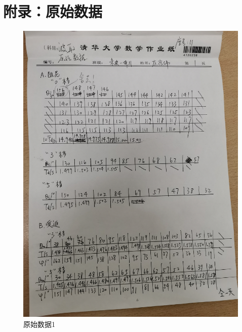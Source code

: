 \documentclass[a4paper,11pt]{article}
\begin{document}
    \section{附录：原始数据}
        \begin{figure}[ht]
            \centering
            \includegraphics[scale=0.16]{原始数据1.jpg}
            \caption{原始数据1}
        \end{figure}
\end{document}
